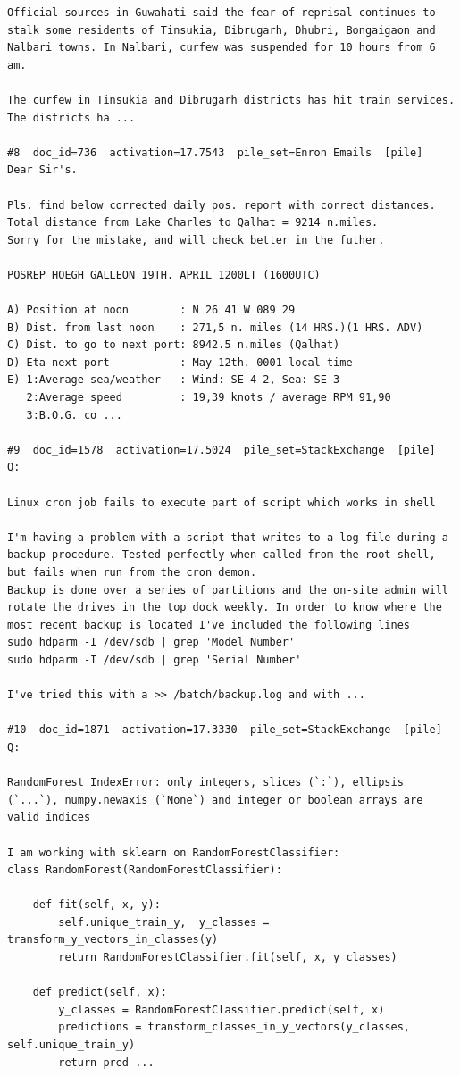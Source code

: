 \begin{verbatim}
Official sources in Guwahati said the fear of reprisal continues to stalk some residents of Tinsukia, Dibrugarh, Dhubri, Bongaigaon and Nalbari towns. In Nalbari, curfew was suspended for 10 hours from 6 am.

The curfew in Tinsukia and Dibrugarh districts has hit train services. The districts ha ...

#8  doc_id=736  activation=17.7543  pile_set=Enron Emails  [pile]
Dear Sir's.

Pls. find below corrected daily pos. report with correct distances.
Total distance from Lake Charles to Qalhat = 9214 n.miles.
Sorry for the mistake, and will check better in the futher.

POSREP HOEGH GALLEON 19TH. APRIL 1200LT (1600UTC)

A) Position at noon        : N 26 41 W 089 29
B) Dist. from last noon    : 271,5 n. miles (14 HRS.)(1 HRS. ADV)
C) Dist. to go to next port: 8942.5 n.miles (Qalhat)
D) Eta next port           : May 12th. 0001 local time
E) 1:Average sea/weather   : Wind: SE 4 2, Sea: SE 3
   2:Average speed         : 19,39 knots / average RPM 91,90
   3:B.O.G. co ...

#9  doc_id=1578  activation=17.5024  pile_set=StackExchange  [pile]
Q:

Linux cron job fails to execute part of script which works in shell

I'm having a problem with a script that writes to a log file during a backup procedure. Tested perfectly when called from the root shell, but fails when run from the cron demon.
Backup is done over a series of partitions and the on-site admin will rotate the drives in the top dock weekly. In order to know where the most recent backup is located I've included the following lines
sudo hdparm -I /dev/sdb | grep 'Model Number'
sudo hdparm -I /dev/sdb | grep 'Serial Number'

I've tried this with a >> /batch/backup.log and with ...

#10  doc_id=1871  activation=17.3330  pile_set=StackExchange  [pile]
Q:

RandomForest IndexError: only integers, slices (`:`), ellipsis (`...`), numpy.newaxis (`None`) and integer or boolean arrays are valid indices

I am working with sklearn on RandomForestClassifier:
class RandomForest(RandomForestClassifier):

    def fit(self, x, y):
        self.unique_train_y,  y_classes = transform_y_vectors_in_classes(y)
        return RandomForestClassifier.fit(self, x, y_classes)

    def predict(self, x):
        y_classes = RandomForestClassifier.predict(self, x)
        predictions = transform_classes_in_y_vectors(y_classes, self.unique_train_y)
        return pred ...

\end{verbatim}

